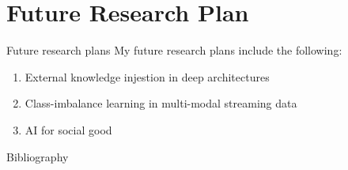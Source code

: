 \documentclass[blue]{beamer}
\begin{document}
\section{Future Research Plan}

\begin{frame}{Future research plans}
 My future research plans include the following:
 \begin{enumerate}
     \item External knowledge injestion in deep architectures
     \item Class-imbalance learning in multi-modal streaming data
     \item AI for social good
 \end{enumerate}
\end{frame}




%
%
%
%



\begin{frame}[allowframebreaks]{Bibliography}
\fontsize{8pt}{7.2}\selectfont


\end{frame}
\end{document}
